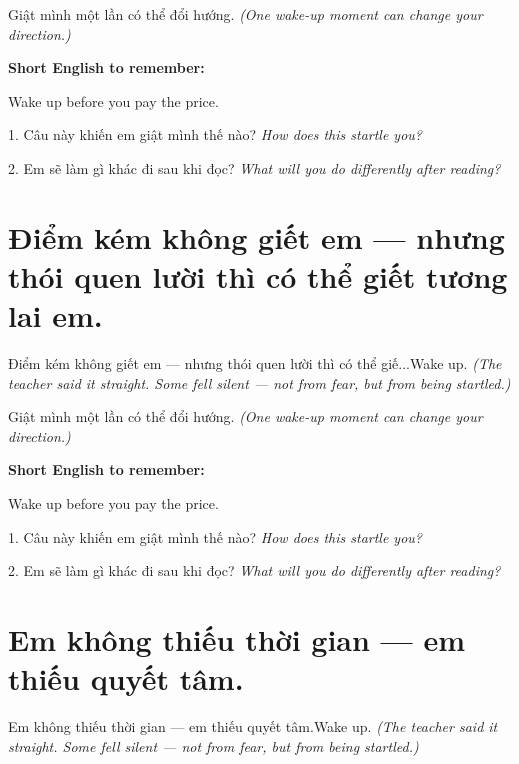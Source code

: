 \begin{baihoc}
Giật mình một lần có thể đổi hướng.
\textit{(One wake-up moment can change your direction.)}
\end{baihoc}

\begin{ghinhoanh}
\textbf{Short English to remember:}

Wake up before you pay the price.

\end{ghinhoanh}

\begin{tuhocnhanh}
1. Câu này khiến em giật mình thế nào? \textit{How does this startle you?}

2. Em sẽ làm gì khác đi sau khi đọc? \textit{What will you do differently after reading?}
\end{tuhocnhanh}
\ngancach


\section{Điểm kém không giết em — nhưng thói quen lười thì có thể giết tương lai em.}
\begin{truyen}{Điểm kém không giết em — nhưng thói quen lười thì có thể giế...}{Wake up.}
\textit{(The teacher said it straight. Some fell silent — not from fear, but from being startled.)}
\end{truyen}

\begin{baihoc}
Giật mình một lần có thể đổi hướng.
\textit{(One wake-up moment can change your direction.)}
\end{baihoc}

\begin{ghinhoanh}
\textbf{Short English to remember:}

Wake up before you pay the price.

\end{ghinhoanh}

\begin{tuhocnhanh}
1. Câu này khiến em giật mình thế nào? \textit{How does this startle you?}

2. Em sẽ làm gì khác đi sau khi đọc? \textit{What will you do differently after reading?}
\end{tuhocnhanh}
\ngancach


\section{Em không thiếu thời gian — em thiếu quyết tâm.}
\begin{truyen}{Em không thiếu thời gian — em thiếu quyết tâm.}{Wake up.}
\textit{(The teacher said it straight. Some fell silent — not from fear, but from being startled.)}
\end{truyen}

